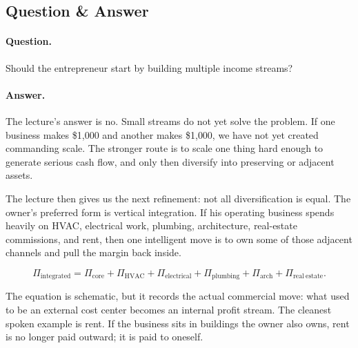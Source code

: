 \subsection{Question \& Answer}

\paragraph{Question.} Should the entrepreneur start by building multiple income streams?

\paragraph{Answer.} The lecture's answer is no. Small streams do not yet solve the problem. If one business makes \$1{,}000 and another makes \$1{,}000, we have not yet created commanding scale. The stronger route is to scale one thing hard enough to generate serious cash flow, and only then diversify into preserving or adjacent assets.

The lecture then gives us the next refinement: not all diversification is equal. The owner's preferred form is vertical integration. If his operating business spends heavily on HVAC, electrical work, plumbing, architecture, real-estate commissions, and rent, then one intelligent move is to own some of those adjacent channels and pull the margin back inside.

\begin{equation}
\Pi_{\mathrm{integrated}}
=
\Pi_{\mathrm{core}}
+
\Pi_{\mathrm{HVAC}}
+
\Pi_{\mathrm{electrical}}
+
\Pi_{\mathrm{plumbing}}
+
\Pi_{\mathrm{arch}}
+
\Pi_{\mathrm{real\ estate}}.
\end{equation}

The equation is schematic, but it records the actual commercial move: what used to be an external cost center becomes an internal profit stream. The cleanest spoken example is rent. If the business sits in buildings the owner also owns, rent is no longer paid outward; it is paid to oneself.

\begin{figure}
\centering
{}
\end{figure}

